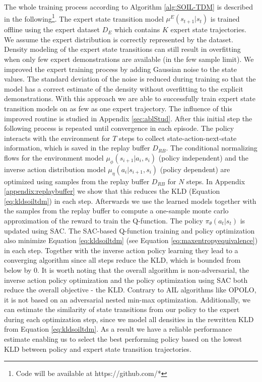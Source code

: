 \documentclass{article}
\begin{document}
The whole training process according to Algorithm \ref{alg:SOIL-TDM} is described in the following\footnote{Code will be available at https://github.com/*}. The expert state transition model $\mu^E(s_{t+1}|s_t)$ is trained offline using the expert dataset $D_E$ which contains $K$ expert state trajectories. We assume the expert distribution is correctly represented by the dataset. Density modeling of the expert state transitions can still result in overfitting when only few expert demonstrations are available (in the few sample limit). We improved the expert training process by adding Gaussian noise to the state values. The standard deviation of the noise is reduced during training so that the model has a correct estimate of the density without overfitting to the explicit demonstrations. With this approach we are able to successfully train expert state transition models on as few as one expert trajectory. The influence of this improved routine is studied in Appendix \ref{sec:ablStud}. After this initial step the following process is repeated until convergence in each episode. The policy interacts with the environment for $T$ steps to collect state-action-next-state information, which is saved in the replay buffer $D_{RB}$. The conditional normalizing flows for the environment model $\mu_{\phi}(s_{i+1}|a_i,s_i)$ (policy independent) and the inverse action distribution model $\mu_{\eta}(a_{i}|s_{i+1},s_i)$ (policy dependent) are optimized using samples from the replay buffer $D_{RB}$ for $N$ steps. In Appendix \ref{appendix:replaybuffer} we show that this reduces the KLD (Equation \ref{eq:kldsoiltdm}) in each step. Afterwards we use the learned models together with the samples from the replay buffer to compute a one-sample monte carlo approximation of the reward to train the Q-function. The policy $\pi_{\theta}(a_t|s_t)$ is updated using SAC. The SAC-based Q-function training and policy optimization also minimize Equation \ref{eq:kldsoiltdm} (see Equation \ref{eq:maxentropyequivalence}) in each step. Together with the inverse action policy learning they lead to a converging algorithm since all steps reduce the KLD, which is bounded from below by $0$. It is worth noting that the overall algorithm is non-adversarial, the inverse action policy optimization and the policy optimization using SAC both reduce the overall objective - the KLD. Contrary to AIL algorithms like OPOLO, it is not based on an adversarial nested min-max optimization. Additionally, we can estimate the similarity of state transitions from our policy to the expert during each optimization step, since we model all densities in the rewritten KLD from Equation \ref{eq:kldsoiltdm}. As a result we have a reliable performance estimate enabling us to select the best performing policy based on the lowest KLD between policy and expert state transition trajectories.
\end{document}
